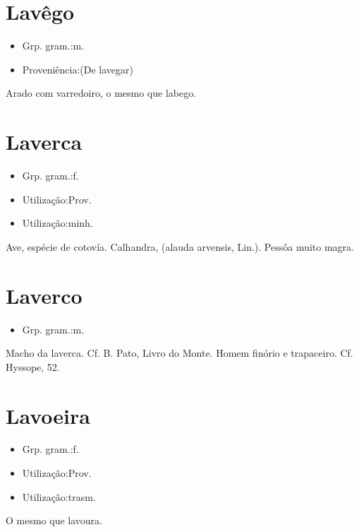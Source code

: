 \section{Lavêgo}
\begin{itemize}
\item {Grp. gram.:m.}
\end{itemize}
\begin{itemize}
\item {Proveniência:(De \textunderscore lavegar\textunderscore )}
\end{itemize}
Arado com varredoiro, o mesmo que \textunderscore labego\textunderscore .
\section{Laverca}
\begin{itemize}
\item {Grp. gram.:f.}
\end{itemize}
\begin{itemize}
\item {Utilização:Prov.}
\end{itemize}
\begin{itemize}
\item {Utilização:minh.}
\end{itemize}
Ave, espécie de cotovía.
Calhandra, (\textunderscore alauda arvensis\textunderscore , Lin.).
Pessôa muito magra.
\section{Laverco}
\begin{itemize}
\item {Grp. gram.:m.}
\end{itemize}
Macho da laverca. Cf. B. Pato, \textunderscore Livro do Monte\textunderscore .
Homem finório e trapaceiro. Cf. \textunderscore Hyssope\textunderscore , 52.
\section{Lavoeira}
\begin{itemize}
\item {Grp. gram.:f.}
\end{itemize}
\begin{itemize}
\item {Utilização:Prov.}
\end{itemize}
\begin{itemize}
\item {Utilização:trasm.}
\end{itemize}
O mesmo que \textunderscore lavoura\textunderscore .
